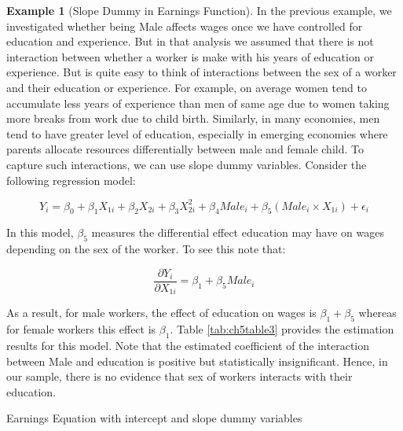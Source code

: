 \documentclass[
]{book}
\theoremstyle{definition}
\theoremstyle{definition}
\newtheorem{example}{Example}[chapter]
\theoremstyle{definition}
\theoremstyle{definition}
\theoremstyle{remark}
\begin{document}
\begin{example}[Slope Dummy in Earnings Function]
\protect\hypertarget{exm:unnamed-chunk-87}{}\label{exm:unnamed-chunk-87}In the previous example, we investigated whether being Male affects wages once we have controlled for education and experience. But in that analysis we assumed that there is not interaction between whether a worker is make with his years of education or experience. But is quite easy to think of interactions between the sex of a worker and their education or experience. For example, on average women tend to accumulate less years of experience than men of same age due to women taking more breaks from work due to child birth. Similarly, in many economies, men tend to have greater level of education, especially in emerging economies where parents allocate resources differentially between male and female child. To capture such interactions, we can use slope dummy variables. Consider the following regression model:

\[Y_i= \beta_0 + \beta_1 X_{1i} + \beta_2 X_{2i} + \beta_3 X_{2i}^2 + \beta_4 Male_i+ \beta_5 (Male_i \times X_{1i}) +\epsilon_i\]

In this model, \(\beta_5\) measures the differential effect education may have on wages depending on the sex of the worker. To see this note that:

\[\frac{\partial Y_i}{\partial X_{1i}}= \beta_1 + \beta_5 Male_i\]

As a result, for male workers, the effect of education on wages is \(\beta_1 + \beta_5\) whereas for female workers this effect is \(\beta_1\). Table \ref{tab:ch5table3} provides the estimation results for this model. Note that the estimated coefficient of the interaction between Male and education is positive but statistically insignificant. Hence, in our sample, there is no evidence that sex of workers interacts with their education.
\end{example}

\label{tab:ch5table3} Earnings Equation with intercept and slope dummy variables
\end{document}
